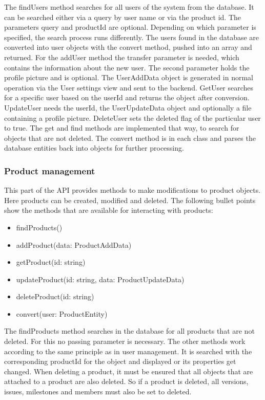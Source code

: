     The findUsers method searches for all users of the system from the database. It can be searched either via a query by user name or via the product id. The parameters query and productId are optional. Depending on which parameter is specified, the search process runs differently. The users found in the database are converted into user objects with the convert method, pushed into an array and returned. For the addUser method the transfer parameter is needed, which contains the information about the new user. The second parameter holds the profile picture and is optional. The UserAddData object is generated in normal operation via the User settings view and sent to the backend. GetUser searches for a specific user based on the userId and returns the object after conversion. UpdateUser needs the userId, the UserUpdateData object and optionally a file containing a profile picture. DeleteUser sets the deleted flag of the particular user to true. The get and find methods are implemented that way, to search for objects that are not deleted. The convert method is in each class and parses the database entities back into objects for further processing.

    \subsubsection*{Product management}
    This part of the API provides methods to make modifications to product objects. Here products can be created, modified and deleted. The following bullet points show the methods that are available for interacting with products:

    \begin{itemize}
        \item findProducts()
        \item addProduct(data: ProductAddData)
        \item getProduct(id: string)
        \item updateProduct(id: string, data: ProductUpdateData)
        \item deleteProduct(id: string)
        \item convert(user: ProductEntity)
    \end{itemize}

    The findProducts method searches in the database for all products that are not deleted. For this no passing parameter is necessary. The other methods work according to the same principle as in user management. It is searched with the corresponding productId for the object and displayed or its properties get changed. When deleting a product, it must be ensured that all objects that are attached to a product are also deleted. So if a product is deleted, all versions, issues, milestones and members must also be set to deleted.

